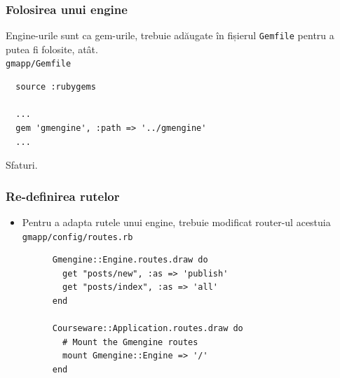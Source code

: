 \documentclass[compress]{beamer}
\begin{document}
\begin{frame}[fragile]
\frametitle{Folosirea unui engine}
Engine-urile sunt ca gem-urile, trebuie adăugate în fișierul \texttt{Gemfile} pentru a putea fi folosite, atât.
\\
\small\texttt{gmapp/Gemfile}
\begin{verbatim}
  source :rubygems

  ...
  gem 'gmengine', :path => '../gmengine'
  ...
\end{verbatim}
\end{frame}

\begin{frame}
  \begin{center}
  \huge Sfaturi.
  \end{center}
\end{frame}

\begin{frame}[fragile]
\frametitle{Re-definirea rutelor}
\begin{itemize}
  \item Pentru a adapta rutele unui engine, trebuie modificat router-ul acestuia
    \\
    \texttt{gmapp/config/routes.rb}
    \begin{verbatim}
      Gmengine::Engine.routes.draw do
        get "posts/new", :as => 'publish'
        get "posts/index", :as => 'all'
      end

      Courseware::Application.routes.draw do
        # Mount the Gmengine routes
        mount Gmengine::Engine => '/'
      end
    \end{verbatim}
\end{itemize}
\end{frame}
\end{document}
